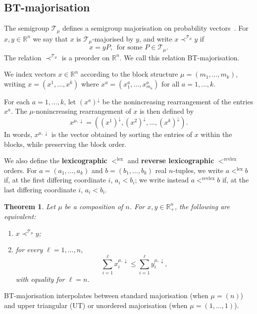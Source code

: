 \documentclass[11pt,a4paper,longbibliography]{amsart}
\numberwithin{equation}{section}
\def\R{{\mathbb R}}
\def\R{{\mathbb R}}
\theoremstyle{plain}
\newtheorem{thm}{Theorem}[section]
\theoremstyle{definition}
\theoremstyle{remark}
\begin{document}
	\subsection{BT-majorisation}
	The semigroup $\mathcal{T}_{\mu}$ defines a semigroup majorisation on probability vectors~\cite{Cunden2025SemigroupMajorisation}. For $x,y\in \R^n$ we say that $x$ is $\mathcal{T}_{\mu}$-majorised by $y$, and write $x\prec^{\mathcal{T}_{\mu}}y$ if $$
	x=yP,\, \text{ for some $P\in\mathcal{T}_{\mu}$.}
	$$
	The relation $\prec^{\mathcal{T}_{\mu}}$ is a preorder on $\R^n$. We call this relation BT-majorisation.
	
	We index vectors $x\in\R^n$ according to the block structure  $\mu=(m_1,\ldots,m_k)$, writing $x=(x^1,\ldots,x^k)$ where $x^a=(x^a_1,\ldots,x^a_{m_a})$ for all $a=1,\ldots,k$.
	
	For each $a=1,\ldots,k$,  let $(x^a)^{\downarrow}$ be the nonincreasing rearrangement of the entries $x^a$. The $\mu$-nonincreasing rearrangement of $x$ is then defined by 
	\begin{equation}\label{eq:NotationMuOrdering}
		x^{\mu,\downarrow}=\left((x^1)^{\downarrow},(x^2)^{\downarrow},\ldots, (x^k)^{\downarrow}\right).
	\end{equation}
	In words, $x^{\mu,\downarrow}$ is the vector obtained by sorting the entries of $x$ 
	within the blocks, while preserving the block order.
	
	We also define the \textbf{lexicographic} $<
	^{\mathrm{lex}}$ and \textbf{reverse lexicographic} $<
	^{\mathrm{revlex}}$ orders. For $a=(a_1,\ldots,a_k)$ and $b=(b_1,\ldots,b_k)$ real $n$-tuples, we write  $a<
	^{\mathrm{lex}}b$ if, at the first differing coordinate $i$, $a_i<b_i$; we write instead $a<
	^{\mathrm{revlex}}b$ if, at the last differing coordinate $i$, $a_i<b_i$.
	
	
	\begin{thm}
		\label{prop:monotones}
		Let $\mu$ be a composition of $n$.
		For $x,y\in\mathbb \R_+^n$, the following are equivalent:
		\begin{enumerate}
			\item $x\prec^{\mathcal T_\mu}y$;
			\item for every $\ell=1,\ldots,n$,
			$$
			\sum_{i=1}^{\ell}x_i^{\mu,\downarrow}
			\le
			\sum_{i=1}^{\ell}y_i^{\mu,\downarrow},
			$$
			with equality for $\ell=n$.
		\end{enumerate}
	\end{thm}
	
	BT-majorisation interpolates between standard majorisation (when $\mu=(n)$) and upper triangular (UT) or unordered majorisation (when $\mu=(1,\ldots,1)$).
\end{document}
